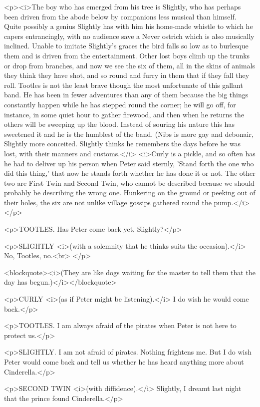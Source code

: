 <p><i>The boy who has emerged from his tree is Slightly, who has
perhaps been driven from the abode below by companions less musical
than himself. Quite possibly a genius Slightly has with him his
home-made whistle to which he capers entrancingly, with no audience
save a Never ostrich which is also musically inclined. Unable to
imitate Slightly's graces the bird falls so low as to burlesque them
and is driven from the entertainment. Other lost boys climb up the
trunks or drop from branches, and now we see the six of them, all in
the skins of animals they think they have shot, and so round and
furry in them that if they fall they roll. Tootles is not the least
brave though the most unfortunate of this gallant band. He has been
in fewer adventures than any of them because the big things
constantly happen while he has stepped round the corner; he will go
off, for instance, in some quiet hour to gather firewood, and then
when he returns the others will be sweeping up the blood. Instead of
souring his nature this has sweetened it and he is the humblest of
the band. (Nibs is more gay and debonair, Slightly more conceited.
Slightly thinks he remembers the days before he was lost, with their
manners and customs.</i> <i>Curly is a pickle, and so often has he
had to deliver up his person when Peter said sternly, 'Stand forth
the one who did this thing,' that now he stands forth whether he has
done it or not. The other two are First Twin and Second Twin, who
cannot be described because we should probably be describing the
wrong one. Hunkering on the ground or peeking out of their holes, the
six are not unlike village gossips gathered round the pump.</i></p>

<p>TOOTLES. Has Peter come back yet, Slightly?</p>

<p>SLIGHTLY <i>(with a solemnity that he thinks suits the
occasion).</i> No, Tootles, no.<br>
</p>

<blockquote><i>(They are like dogs waiting for the master to tell
them that the day has begun.)</i></blockquote>

<p>CURLY <i>(as if Peter might be listening).</i> I do wish he would
come back.</p>

<p>TOOTLES. I am always afraid of the pirates when Peter is not here
to protect us.</p>

<p>SLIGHTLY. I am not afraid of pirates. Nothing frightens me. But I
do wish Peter would come back and tell us whether he has heard
anything more about Cinderella.</p>

<p>SECOND TWIN <i>(with diffidence).</i> Slightly, I dreamt last
night that the prince found Cinderella.</p>

